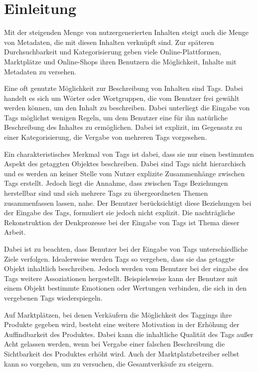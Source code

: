 \chapter{Einleitung}

Mit der steigenden Menge von nutzergenerierten Inhalten steigt auch die Menge von Metadaten, die mit diesen Inhalten verknüpft sind. Zur späteren Durchsuchbarkeit und Kategorisierung geben viele Online-Plattformen, Marktplätze und Online-Shops ihren Benutzern die Möglichkeit, Inhalte mit Metadaten zu versehen.

Eine oft genutzte Möglichkeit zur Beschreibung von Inhalten sind Tags. Dabei handelt es sich um Wörter oder Wortgruppen, die vom Benutzer frei gewählt werden können, um den Inhalt zu beschreiben. Dabei unterliegt die Eingabe von Tags möglichst wenigen Regeln, um dem Benutzer eine für ihn natürliche Beschreibung des Inhaltes zu ermöglichen. Dabei ist explizit, im Gegensatz zu einer Kategorisierung, die Vergabe von mehreren Tags vorgesehen.

Ein charakteristisches Merkmal von Tags ist dabei, dass sie nur einen bestimmten Aspekt des getaggten Objektes beschreiben. Dabei sind Tags nicht hierarchisch und es werden an keiner Stelle vom Nutzer explizite Zusammenhänge zwischen Tags erstellt. Jedoch liegt die Annahme, dass zwischen Tags Beziehungen herstellbar sind und sich mehrere Tags zu übergeordneten Themen zusammenfassen lassen, nahe. Der Benutzer berücksichtigt diese Beziehungen bei der Eingabe des Tags, formuliert sie jedoch nicht explizit. Die nachträgliche Rekonstruktion der Denkprozesse bei der Eingabe von Tags ist Thema dieser Arbeit.

Dabei ist zu beachten, dass Benutzer bei der Eingabe von Tags unterschiedliche Ziele verfolgen. Idealerweise werden Tags so vergeben, dass sie das getaggte Objekt inhaltlich beschreiben. Jedoch werden vom Benutzer bei der eingabe des Tags weitere Assoziationen hergestellt. Beispielsweise kann der Benutzer mit einem Objekt bestimmte Emotionen oder Wertungen verbinden, die sich in den vergebenen Tags wiederspiegeln.

Auf Marktplätzen, bei denen Verkäufern die Möglichkeit des Taggings ihre Produkte gegeben wird, besteht eine weitere Motivation in der Erhöhung der Auffindbarkeit des Produktes. Dabei kann die inhaltliche Qualität des Tags außer Acht gelassen werden, wenn bei Vergabe einer falschen Beschreibung die Sichtbarkeit des Produktes erhöht wird. Auch der Marktplatzbetreiber selbst kann so vorgehen, um zu versuchen, die Gesamtverkäufe zu steigern.

